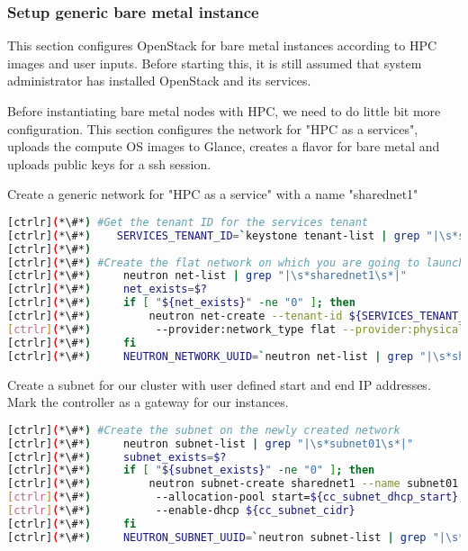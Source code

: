 \subsubsection{Setup generic bare metal instance}

	This section configures OpenStack for bare metal instances according to HPC images and user inputs. Before starting this, it is still assumed that system administrator has installed OpenStack and its services.

	Before instantiating bare metal nodes with HPC, we need to do little bit more configuration. This section configures the network for "HPC as a services", uploads the compute OS images to Glance, creates a flavor for bare metal and uploads public keys for a ssh session.

	Create a generic network for "HPC as a service" with a name "sharednet1"

\begin{lstlisting}[language=bash,keywords={}]
[ctrlr](*\#*) #Get the tenant ID for the services tenant
[ctrlr](*\#*)    SERVICES_TENANT_ID=`keystone tenant-list | grep "|\s*services\s*|" | awk '{print $2}'`
[ctrlr](*\#*) 
[ctrlr](*\#*) #Create the flat network on which you are going to launch instances
[ctrlr](*\#*)     neutron net-list | grep "|\s*sharednet1\s*|"
[ctrlr](*\#*)     net_exists=$?
[ctrlr](*\#*)     if [ "${net_exists}" -ne "0" ]; then
[ctrlr](*\#*)         neutron net-create --tenant-id ${SERVICES_TENANT_ID} sharednet1 --shared \
[ctrlr](*\#*)          --provider:network_type flat --provider:physical_network physnet1
[ctrlr](*\#*)     fi
[ctrlr](*\#*)     NEUTRON_NETWORK_UUID=`neutron net-list | grep "|\s*sharednet1\s*|" | awk '{print $2}'`
\end{lstlisting}


	Create a subnet for our cluster with user defined start and end IP addresses. Mark the controller as a gateway for our instances.


\begin{lstlisting}[language=bash,keywords={}]
[ctrlr](*\#*) #Create the subnet on the newly created network
[ctrlr](*\#*)     neutron subnet-list | grep "|\s*subnet01\s*|"
[ctrlr](*\#*)     subnet_exists=$?
[ctrlr](*\#*)     if [ "${subnet_exists}" -ne "0" ]; then
[ctrlr](*\#*)         neutron subnet-create sharednet1 --name subnet01 --ip-version=4 --gateway=${controller_ip} \
[ctrlr](*\#*)          --allocation-pool start=${cc_subnet_dhcp_start},end=${cc_subnet_dhcp_end} \
[ctrlr](*\#*)          --enable-dhcp ${cc_subnet_cidr}
[ctrlr](*\#*)     fi
[ctrlr](*\#*)     NEUTRON_SUBNET_UUID=`neutron subnet-list | grep "|\s*subnet01\s*|" | awk '{print $2}'`
\end{lstlisting} 

